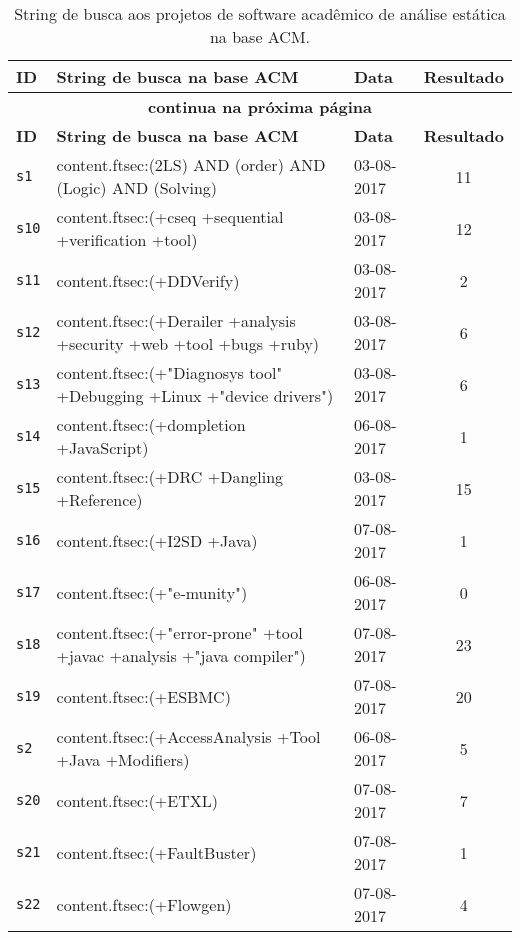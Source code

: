 \begin{longtable}{| l | p{13cm} | l | c |}
  \caption{String de busca aos projetos de software acadêmico de análise estática na base ACM.}
  \label{search-strings-table-acm} \\
  \hline
  \endfirsthead
  \hline
  \textbf{ID} & \textbf{String de busca na base ACM} & \textbf{Data} & \textbf{Resultado} \\
  \hline
  \endhead
  \multicolumn{4}{c}{\textbf{continua na próxima página}} \\
  \hhline{----} \endfoot
  \endlastfoot
  \textbf{ID} & \textbf{String de busca na base ACM} & \textbf{Data} & \textbf{Resultado} \\
  \hline
\texttt{s1} & content.ftsec:(2LS) AND (order) AND (Logic) AND (Solving) & 03-08-2017 & 11 \\
    \hline
\texttt{s10} & content.ftsec:(+cseq +sequential +verification +tool) & 03-08-2017 & 12 \\
    \hline
\texttt{s11} & content.ftsec:(+DDVerify) & 03-08-2017 & 2 \\
    \hline
\texttt{s12} & content.ftsec:(+Derailer +analysis +security +web +tool +bugs +ruby) & 03-08-2017 & 6 \\
    \hline
\texttt{s13} & content.ftsec:(+"Diagnosys tool" +Debugging +Linux +"device drivers") & 03-08-2017 & 6 \\
    \hline
\texttt{s14} & content.ftsec:(+dompletion +JavaScript) & 06-08-2017 & 1 \\
    \hline
\texttt{s15} & content.ftsec:(+DRC +Dangling +Reference) & 03-08-2017 & 15 \\
    \hline
\texttt{s16} & content.ftsec:(+I2SD +Java) & 07-08-2017 & 1 \\
    \hline
\texttt{s17} & content.ftsec:(+"e-munity") & 06-08-2017 & 0 \\
    \hline
\texttt{s18} & content.ftsec:(+"error-prone" +tool +javac +analysis +"java compiler") & 07-08-2017 & 23 \\
    \hline
\texttt{s19} & content.ftsec:(+ESBMC) & 07-08-2017 & 20 \\
    \hline
\texttt{s2} & content.ftsec:(+AccessAnalysis +Tool +Java +Modifiers) & 06-08-2017 & 5 \\
    \hline
\texttt{s20} & content.ftsec:(+ETXL) & 07-08-2017 & 7 \\
    \hline
\texttt{s21} & content.ftsec:(+FaultBuster) & 07-08-2017 & 1 \\
    \hline
\texttt{s22} & content.ftsec:(+Flowgen) & 07-08-2017 & 4 \\

\end{longtable}
